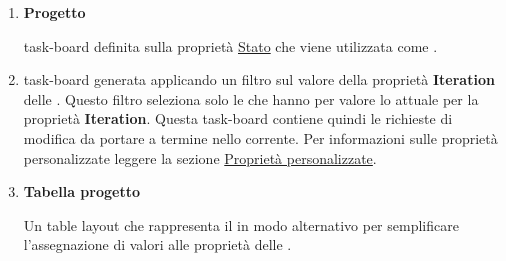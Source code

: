 \begin{enumerate}
    \item \textbf{Progetto}
    
    task-board definita sulla proprietà \hyperref[subpar:github_stato]{Stato} che viene utilizzata come .

    \item \textbf{} \label{item:sprint_backlog}
    
    task-board generata applicando un filtro sul valore della proprietà \textbf{Iteration} delle .
    Questo filtro seleziona solo le  che hanno per valore lo  attuale per la proprietà \textbf{Iteration}.
    Questa task-board contiene quindi le richieste di modifica da portare a termine nello  corrente.
    Per informazioni sulle proprietà personalizzate leggere la sezione \hyperref[subpar:proprietà_personalizzate]{Proprietà personalizzate}.

    \item \textbf{Tabella progetto}
    
    Un table layout che rappresenta il  in modo alternativo per semplificare l'assegnazione di valori alle proprietà delle .
\end{enumerate}


